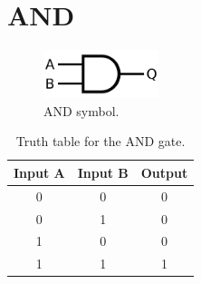 \section{AND}
	\begin{figure}[H]
	    \centering
	    \includegraphics[width=0.3\textwidth]{figures/symbols/AND.png}
	    \caption{AND symbol.}
	    \label{fig:AND_sym} 
	\end{figure}

	\begin{table}[ht]
	\centering
	\begin{tabular}{|c|c|c|}
		\hline
		Input A & Input B & Output \\
		\hline
		0 & 0 & 0 \\
		0 & 1 & 0 \\
		1 & 0 & 0 \\
		1 & 1 & 1 \\
		\hline
	\end{tabular}
	\caption{Truth table for the AND gate.}
	\end{table}

